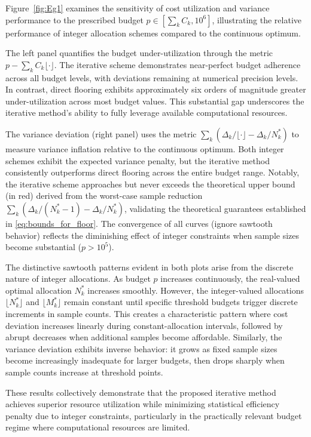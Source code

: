 Figure~\ref{fig:Eg1} examines the sensitivity of cost utilization and variance performance to the prescribed budget $p \in [\sum_k C_k, 10^6]$, illustrating the relative performance of integer allocation schemes compared to the continuous optimum.

The left panel quantifies the budget under-utilization through the metric $p - \sum_k C_k \lfloor \cdot \rfloor$. The iterative scheme demonstrates near-perfect budget adherence across all budget levels, with deviations remaining at numerical precision levels. In contrast, direct flooring exhibits approximately six orders of magnitude greater under-utilization across most budget values. This substantial gap underscores the iterative method's ability to fully leverage available computational resources.



The variance deviation (right panel) uses the metric $\sum_k (\Delta_k/\lfloor \cdot \rfloor - \Delta_k/N_k^*)$ to measure variance inflation relative to the continuous optimum. Both integer schemes exhibit the expected variance penalty, but the iterative method consistently outperforms direct flooring across the entire budget range. Notably, the iterative scheme approaches but never exceeds the theoretical upper bound (in red) derived from the worst-case sample reduction $\sum_k (\Delta_k/(N_k^*-1) - \Delta_k/N_k^*)$, validating the theoretical guarantees established in \eqref{eq:bounds_for_floor}. The convergence of all curves (ignore sawtooth behavior) reflects the diminishing effect of integer constraints when sample sizes become substantial ($p > 10^5$).


The distinctive sawtooth patterns evident in both plots arise from the discrete nature of integer allocations. As budget $p$ increases continuously, the real-valued optimal allocation $N_k^*$ increases smoothly. However, the integer-valued allocations $\lfloor N_k^* \rfloor$ and $\lfloor M_k^* \rfloor$ remain constant until specific threshold budgets trigger discrete increments in sample counts. This creates a characteristic pattern where cost deviation increases linearly during constant-allocation intervals, followed by abrupt decreases when additional samples become affordable. Similarly, the variance deviation exhibits inverse behavior: it grows as fixed sample sizes become increasingly inadequate for larger budgets, then drops sharply when sample counts increase at threshold points.


These results collectively demonstrate that the proposed iterative method achieves superior resource utilization while minimizing statistical efficiency penalty due to integer constraints, particularly in the practically relevant budget regime where computational resources are limited.



